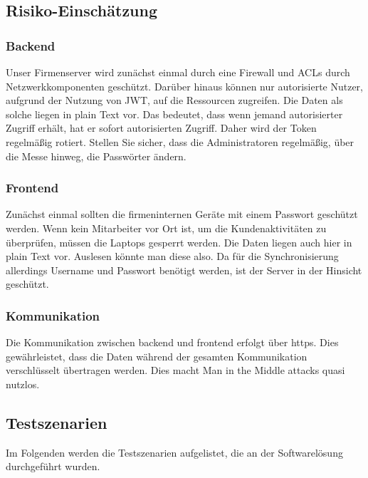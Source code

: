\newpage
\subsection{Risiko-Einschätzung} 

\subsubsection{Backend}

Unser Firmenserver wird zunächst einmal durch eine Firewall und ACLs durch Netzwerkkomponenten geschützt. Darüber hinaus können nur autorisierte Nutzer, aufgrund der Nutzung von JWT, auf die Ressourcen zugreifen. Die Daten als solche liegen in plain Text vor. Das bedeutet, dass wenn jemand autorisierter Zugriff erhält, hat er sofort autorisierten Zugriff. Daher wird der Token regelmäßig rotiert. Stellen Sie sicher, dass die Administratoren regelmäßig, über die Messe hinweg, die Passwörter ändern. 

\subsubsection{Frontend}

Zunächst einmal sollten die firmeninternen Geräte mit einem Passwort geschützt werden. Wenn kein Mitarbeiter vor Ort ist, um die Kundenaktivitäten zu überprüfen, müssen die Laptops gesperrt werden. Die Daten liegen auch hier in plain Text vor. Auslesen könnte man diese also. Da für die Synchronisierung allerdings Username und Passwort benötigt werden, ist der Server in der Hinsicht geschützt. 

\subsubsection{Kommunikation}

Die Kommunikation zwischen backend und frontend erfolgt über https. Dies gewährleistet, dass die Daten während der gesamten Kommunikation verschlüsselt übertragen werden. Dies macht Man in the Middle attacks quasi nutzlos. 


\newpage
\subsection{Testszenarien}

Im Folgenden werden die Testszenarien aufgelistet, die an der Softwarelösung durchgeführt wurden.

